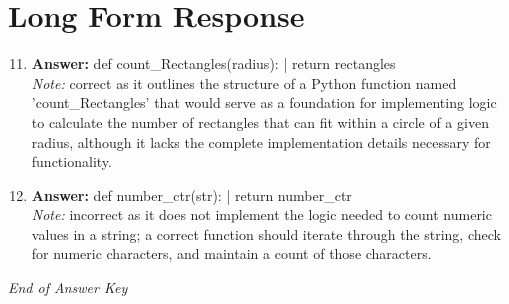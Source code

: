 \documentclass[12pt]{article}
\begin{document}
\section*{Long Form Response}
\begin{enumerate}[label=\arabic*.]
\setcounter{enumi}{10}
\item \textbf{Answer:} def count\_Rectangles(radius): | return rectangles
\\ \textit{Note:} correct as it outlines the structure of a Python function named 'count\_Rectangles' that would serve as a foundation for implementing logic to calculate the number of rectangles that can fit within a circle of a given radius, although it lacks the complete implementation details necessary for functionality.
\item \textbf{Answer:} def number\_ctr(str): | return number\_ctr
\\ \textit{Note:} incorrect as it does not implement the logic needed to count numeric values in a string; a correct function should iterate through the string, check for numeric characters, and maintain a count of those characters.
\end{enumerate}

\vfill
\noindent\textit{End of Answer Key}
\end{document}
